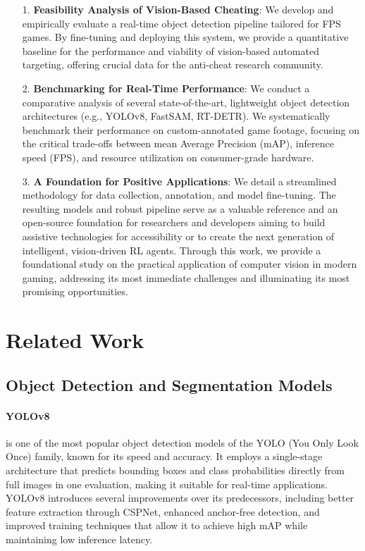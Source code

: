 \documentclass{article}
\begin{document}
\begin{itemize}
\item[1.] \textbf{Feasibility Analysis of Vision-Based Cheating}: We develop and empirically evaluate a real-time object detection pipeline tailored for FPS games. By fine-tuning and deploying this system, we provide a quantitative baseline for the performance and viability of vision-based automated targeting, offering crucial data for the anti-cheat research community.

\item[2.] \textbf{Benchmarking for Real-Time Performance}: We conduct a comparative analysis of several state-of-the-art, lightweight object detection architectures (e.g., YOLOv8, FastSAM, RT-DETR). We systematically benchmark their performance on custom-annotated game footage, focusing on the critical trade-offs between mean Average Precision (mAP), inference speed (FPS), and resource utilization on consumer-grade hardware.

\item[3.] \textbf{A Foundation for Positive Applications}: We detail a streamlined methodology for data collection, annotation, and model fine-tuning. The resulting models and robust pipeline serve as a valuable reference and an open-source foundation for researchers and developers aiming to build assistive technologies for accessibility or to create the next generation of intelligent, vision-driven RL agents.
Through this work, we provide a foundational study on the practical application of computer vision in modern gaming, addressing its most immediate challenges and illuminating its most promising opportunities.
\end{itemize}

\section{Related Work}
\subsection{Object Detection and Segmentation Models}

\paragraph{YOLOv8} \cite{reis2024realtimeflyingobjectdetection} is one of the most popular object detection models of the YOLO (You Only Look Once) family, known for its speed and accuracy. It employs a single-stage architecture that predicts bounding boxes and class probabilities directly from full images in one evaluation, making it suitable for real-time applications. YOLOv8 introduces several improvements over its predecessors, including better feature extraction through CSPNet, enhanced anchor-free detection, and improved training techniques that allow it to achieve high mAP while maintaining low inference latency.
\end{document}
